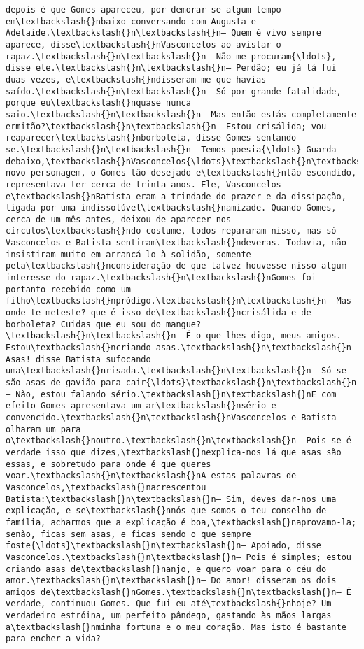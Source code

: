 \begin{Verbatim}[commandchars=\\\{\}]
depois é que Gomes apareceu, por demorar-se algum tempo em\textbackslash{}nbaixo conversando com Augusta e Adelaide.\textbackslash{}n\textbackslash{}n— Quem é vivo sempre aparece, disse\textbackslash{}nVasconcelos ao avistar o rapaz.\textbackslash{}n\textbackslash{}n— Não me procuram{\ldots}, disse ele.\textbackslash{}n\textbackslash{}n— Perdão; eu já lá fui duas vezes, e\textbackslash{}ndisseram-me que havias saído.\textbackslash{}n\textbackslash{}n— Só por grande fatalidade, porque eu\textbackslash{}nquase nunca saio.\textbackslash{}n\textbackslash{}n— Mas então estás completamente ermitão?\textbackslash{}n\textbackslash{}n— Estou crisálida; vou reaparecer\textbackslash{}nborboleta, disse Gomes sentando-se.\textbackslash{}n\textbackslash{}n— Temos poesia{\ldots} Guarda debaixo,\textbackslash{}nVasconcelos{\ldots}\textbackslash{}n\textbackslash{}nO novo personagem, o Gomes tão desejado e\textbackslash{}ntão escondido, representava ter cerca de trinta anos. Ele, Vasconcelos e\textbackslash{}nBatista eram a trindade do prazer e da dissipação, ligada por uma indissolúvel\textbackslash{}namizade. Quando Gomes, cerca de um mês antes, deixou de aparecer nos círculos\textbackslash{}ndo costume, todos repararam nisso, mas só Vasconcelos e Batista sentiram\textbackslash{}ndeveras. Todavia, não insistiram muito em arrancá-lo à solidão, somente pela\textbackslash{}nconsideração de que talvez houvesse nisso algum interesse do rapaz.\textbackslash{}n\textbackslash{}nGomes foi portanto recebido como um filho\textbackslash{}npródigo.\textbackslash{}n\textbackslash{}n— Mas onde te meteste? que é isso de\textbackslash{}ncrisálida e de borboleta? Cuidas que eu sou do mangue?\textbackslash{}n\textbackslash{}n— É o que lhes digo, meus amigos. Estou\textbackslash{}ncriando asas.\textbackslash{}n\textbackslash{}n— Asas! disse Batista sufocando uma\textbackslash{}nrisada.\textbackslash{}n\textbackslash{}n— Só se são asas de gavião para cair{\ldots}\textbackslash{}n\textbackslash{}n— Não, estou falando sério.\textbackslash{}n\textbackslash{}nE com efeito Gomes apresentava um ar\textbackslash{}nsério e convencido.\textbackslash{}n\textbackslash{}nVasconcelos e Batista olharam um para o\textbackslash{}noutro.\textbackslash{}n\textbackslash{}n— Pois se é verdade isso que dizes,\textbackslash{}nexplica-nos lá que asas são essas, e sobretudo para onde é que queres voar.\textbackslash{}n\textbackslash{}nA estas palavras de Vasconcelos,\textbackslash{}nacrescentou Batista:\textbackslash{}n\textbackslash{}n— Sim, deves dar-nos uma explicação, e se\textbackslash{}nnós que somos o teu conselho de família, acharmos que a explicação é boa,\textbackslash{}naprovamo-la; senão, ficas sem asas, e ficas sendo o que sempre foste{\ldots}\textbackslash{}n\textbackslash{}n— Apoiado, disse Vasconcelos.\textbackslash{}n\textbackslash{}n— Pois é simples; estou criando asas de\textbackslash{}nanjo, e quero voar para o céu do amor.\textbackslash{}n\textbackslash{}n— Do amor! disseram os dois amigos de\textbackslash{}nGomes.\textbackslash{}n\textbackslash{}n— É verdade, continuou Gomes. Que fui eu até\textbackslash{}nhoje? Um verdadeiro estróina, um perfeito pândego, gastando às mãos largas a\textbackslash{}nminha fortuna e o meu coração. Mas isto é bastante para encher a vida? 
\end{Verbatim}
